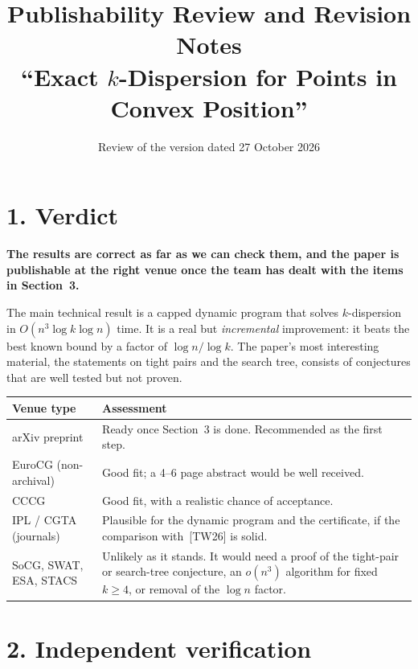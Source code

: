 \documentclass[11pt,a4paper]{article}
\title{Publishability Review and Revision Notes\\[2pt]\large ``Exact $k$-Dispersion for Points in Convex Position''}
\date{Review of the version dated 27 October 2026}
\begin{document}
\maketitle

\section*{1. Verdict}

\textbf{The results are correct as far as we can check them, and the paper is
publishable at the right venue once the team has dealt with the items in Section~3.}

The main technical result is a capped dynamic program that solves $k$-dispersion in
$O(n^3\log k\log n)$ time. It is a real but \emph{incremental} improvement: it beats
the best known bound by a factor of $\log n/\log k$. The paper's most interesting
material, the statements on tight pairs and the search tree, consists
of conjectures that are well tested but not proven.

\begin{center}
\begin{tabular}{@{}p{4.3cm}p{10.9cm}@{}}
\toprule
Venue type & Assessment\\
\midrule
arXiv preprint & Ready once Section~3 is done. Recommended as the first step.\\
EuroCG (non-archival) & Good fit; a 4--6 page abstract would be well received.\\
CCCG & Good fit, with a realistic chance of acceptance.\\
IPL / CGTA (journals) & Plausible for the dynamic program and the certificate, if the comparison with~[TW26] is solid.\\
SoCG, SWAT, ESA, STACS & Unlikely as it stands. It would need a proof of the tight-pair or search-tree conjecture, an $o(n^3)$ algorithm for fixed $k\ge4$, or removal of the $\log n$ factor.\\
\bottomrule
\end{tabular}
\end{center}

\section*{2. Independent verification}
\end{document}
